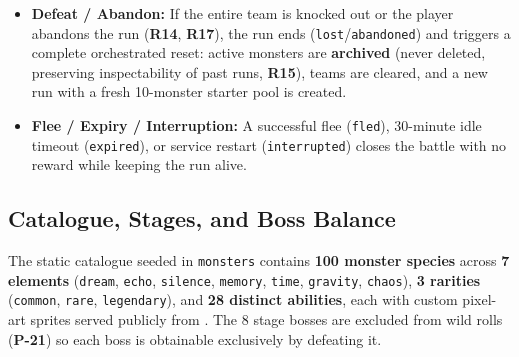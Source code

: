 \documentclass[10.5pt,a4paper]{article}
\DeclareRobustCommand{\code}[1]{\begingroup\def\_{\textunderscore\allowbreak}\texttt{#1}\endgroup}
\begin{document}
\begin{enumerate}
\begin{itemize}
      \item \textbf{Defeat / Abandon:} If the entire team is knocked out or the player abandons the run (\textbf{R14}, \textbf{R17}), the run ends (\code{lost}/\code{abandoned}) and triggers a complete orchestrated reset: active monsters are \textbf{archived} (never deleted, preserving inspectability of past runs, \textbf{R15}), teams are cleared, and a new run with a fresh 10-monster starter pool is created.
      \item \textbf{Flee / Expiry / Interruption:} A successful flee (\code{fled}), 30-minute idle timeout (\code{expired}), or service restart (\code{interrupted}) closes the battle with no reward while keeping the run alive.
    \end{itemize}
\end{enumerate}

\subsection{Catalogue, Stages, and Boss Balance}

The static catalogue seeded in \code{monsters} contains \textbf{100 monster species} across \textbf{7 elements} (\code{dream}, \code{echo}, \code{silence}, \code{memory}, \code{time}, \code{gravity}, \code{chaos}), \textbf{3 rarities} (\code{common}, \code{rare}, \code{legendary}), and \textbf{28 distinct abilities}, each with custom pixel-art sprites served publicly from . The 8 stage bosses are excluded from wild rolls (\textbf{P-21}) so each boss is obtainable exclusively by defeating it.
\end{document}
